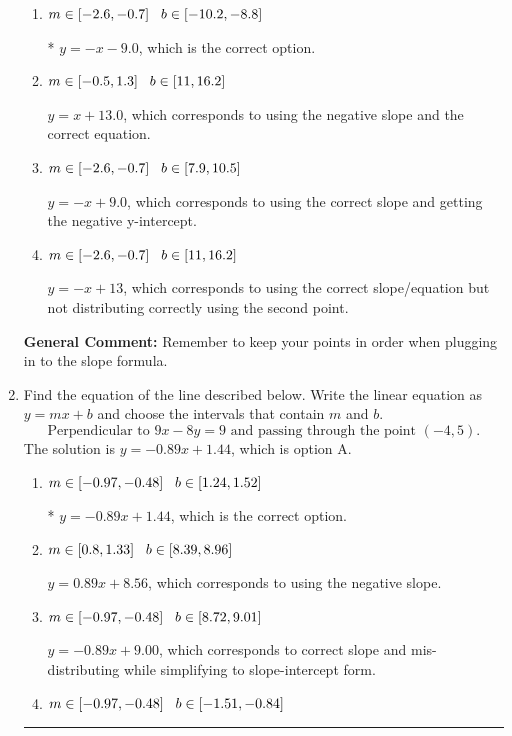 \documentclass{extbook}[14pt]
\newcommand{\litem}[1]{\item #1

\rule{\textwidth}{0.4pt}}
\begin{document}
\begin{enumerate}
{\begin{enumerate}[label=\Alph*.]
 $y = -x + 5$, which corresponds to using the correct slope/equation but not distributing correctly using the first point.
\item \( m \in [-2.6, -0.7] \hspace*{3mm} b \in [-10.2, -8.8] \)

* $y = -x -9.0$, which is the correct option.
\item \( m \in [-0.5, 1.3] \hspace*{3mm} b \in [11, 16.2] \)

 $y = x + 13.0$, which corresponds to using the negative slope and the correct equation.
\item \( m \in [-2.6, -0.7] \hspace*{3mm} b \in [7.9, 10.5] \)

 $y = -x + 9.0$, which corresponds to using the correct slope and getting the negative y-intercept.
\item \( m \in [-2.6, -0.7] \hspace*{3mm} b \in [11, 16.2] \)

 $y = -x + 13$, which corresponds to using the correct slope/equation but not distributing correctly using the second point.
\end{enumerate}

\textbf{General Comment:} Remember to keep your points in order when plugging in to the slope formula.
}
\litem{
Find the equation of the line described below. Write the linear equation as $ y=mx+b $ and choose the intervals that contain $m$ and $b$.
\[ \text{Perpendicular to } 9 x - 8 y = 9 \text{ and passing through the point } (-4, 5). \]The solution is \( y = -0.89x + 1.44 \), which is option A.\begin{enumerate}[label=\Alph*.]
\item \( m \in [-0.97, -0.48] \hspace*{3mm} b \in [1.24, 1.52] \)

* $y = -0.89x + 1.44$, which is the correct option.
\item \( m \in [0.8, 1.33] \hspace*{3mm} b \in [8.39, 8.96] \)

 $y = 0.89x + 8.56$, which corresponds to using the negative slope.
\item \( m \in [-0.97, -0.48] \hspace*{3mm} b \in [8.72, 9.01] \)

 $y = -0.89x + 9.00$, which corresponds to correct slope and mis-distributing while simplifying to slope-intercept form.
\item \( m \in [-0.97, -0.48] \hspace*{3mm} b \in [-1.51, -0.84] \)


\end{enumerate}}
\end{enumerate}
\end{document}
